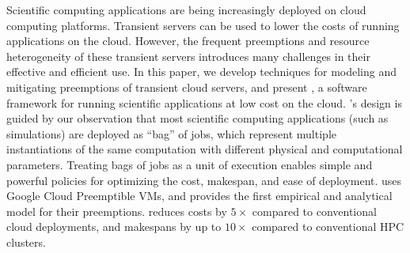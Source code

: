 Scientific computing applications are being increasingly deployed on cloud computing platforms.
%
Transient servers can be used to lower the costs of running applications on the cloud.
%
However, the frequent preemptions and resource heterogeneity of these transient servers introduces many challenges in their effective and efficient use.
%
In this paper, we develop techniques for modeling and mitigating preemptions of transient cloud servers, and present \sysname, a software framework for running scientific applications at low cost on the cloud.
%
\sysname's design is guided by our observation that most  scientific computing applications (such as simulations) are deployed as ``bag'' of jobs, which represent multiple instantiations of the same computation with different physical and computational parameters.
%
Treating bags of jobs as a unit of execution enables simple and powerful policies for optimizing the cost, makespan, and ease of deployment.
%
\sysname uses Google Cloud Preemptible VMs, and provides the first empirical and analytical model for their preemptions.
%
\sysname reduces costs by $5\times$ compared to conventional cloud deployments, and makespans by up to $10\times$ compared to conventional HPC clusters.









